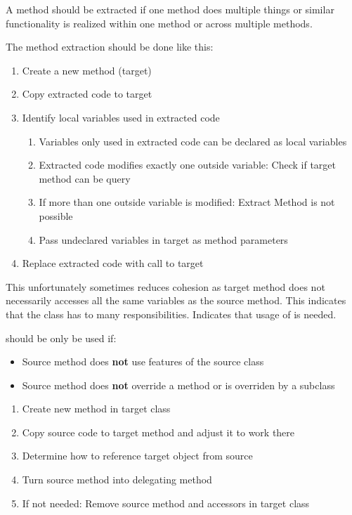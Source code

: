 \documentclass[
../../Software_Engineering_Summary.tex,
]
{subfiles}
\begin{document}
\begin{defbox}
    A method should be extracted if one method does multiple things or similar functionality is realized within one method or across multiple methods.

    The method extraction should be done like this:
    \begin{enumerate}
        \item Create a new method (target)
        \item Copy extracted code to target
        \item Identify local variables used in extracted code
        \begin{enumerate}[label*=\arabic*.]
            \item Variables only used in extracted code can be declared as local variables
            \item Extracted code modifies exactly one outside variable: Check if target method can be query
            \item If more than one outside variable is modified: Extract Method is not possible
            \item Pass undeclared variables in target as method parameters
        \end{enumerate}
        \item Replace extracted code with call to target
    \end{enumerate}
\end{defbox}

This unfortunately sometimes reduces cohesion as target method does not necessarily accesses all the same variables as the source method. This indicates that the class has to many responsibilities. Indicates that usage of  is needed.

 should be only be used if:
\begin{itemize}
    \item Source method does \textbf{not} use features of the source class
    \item Source method does \textbf{not} override a method or is overriden by a subclass
\end{itemize}

\begin{defbox}
    \begin{enumerate}
        \item Create new method in target class
        \item Copy source code to target method and adjust it to work there
        \item Determine how to reference target object from source 
        \item Turn source method into delegating method
        \item If not needed: Remove source method and accessors in target class
    \end{enumerate}
\end{defbox}
\end{document}
